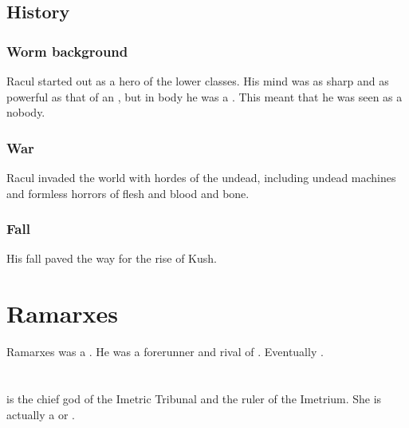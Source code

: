 \subsection{History}





\subsubsection{Worm background}
Racul started out as a hero of the lower classes. 
His mind was as sharp and as powerful as that of an , but in body he was a .
This meant that he was seen as a nobody. 





\subsubsection{War}
Racul invaded the world with hordes of the undead, including undead machines and formless horrors of flesh and blood and bone. 





\subsubsection{Fall}
His fall paved the way for the rise of Kush.















\section{Ramarxes}
Ramarxes was a \caisith.
He was a forerunner and rival of . 
Eventually . 















\section{\Sarokash}
\index{\Sarokash}
\Sarokash is the chief god of the Imetric Tribunal and the ruler of the Imetrium. 
She is actually a \dragon or \nagalord. 









